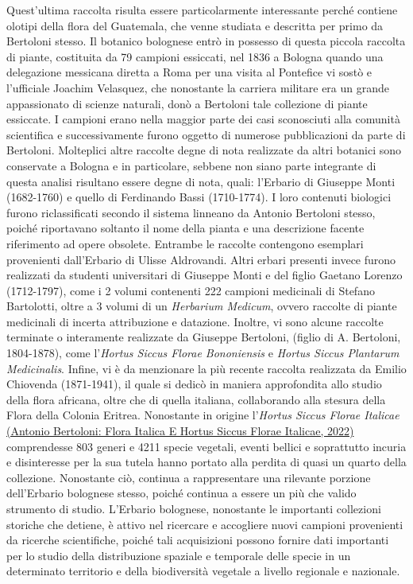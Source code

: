 \documentclass[main.tex]{subfiles}
\begin{document}
Quest’ultima raccolta risulta essere particolarmente interessante perché contiene olotipi della flora del Guatemala, che venne studiata e descritta per primo da Bertoloni stesso. Il botanico bolognese entrò in possesso di questa piccola raccolta di piante, costituita da 79 campioni essiccati, nel 1836 a Bologna quando una delegazione messicana diretta a Roma per una visita al Pontefice vi sostò e l’ufficiale Joachim Velasquez, che nonostante la carriera militare era un grande appassionato di scienze naturali, donò a Bertoloni tale collezione di piante essiccate. I campioni erano nella maggior parte dei casi sconosciuti alla comunità scientifica e successivamente furono oggetto di numerose pubblicazioni da parte di Bertoloni.
Molteplici altre raccolte degne di nota realizzate da altri botanici sono conservate a Bologna e in particolare, sebbene non siano parte integrante di questa analisi risultano essere degne di nota, quali: l’Erbario di Giuseppe Monti (1682-1760) e quello di Ferdinando Bassi (1710-1774). I loro contenuti biologici furono riclassificati secondo il sistema linneano da Antonio Bertoloni stesso, poiché riportavano soltanto il nome della pianta e una descrizione facente riferimento ad opere obsolete. Entrambe le raccolte contengono esemplari provenienti dall’Erbario di Ulisse Aldrovandi. Altri erbari presenti invece furono realizzati da studenti universitari di Giuseppe Monti e del figlio Gaetano Lorenzo (1712-1797), come i 2 volumi contenenti 222 campioni medicinali di Stefano Bartolotti, oltre a 3 volumi di un \textit{Herbarium Medicum}, ovvero raccolte di piante medicinali di incerta attribuzione e datazione. Inoltre, vi sono alcune raccolte terminate o interamente realizzate da Giuseppe Bertoloni, (figlio di A. Bertoloni, 1804-1878), come l’\textit{Hortus Siccus Florae Bononiensis} e \textit{Hortus Siccus Plantarum Medicinalis}. Infine, vi è da menzionare la più recente raccolta realizzata da Emilio Chiovenda (1871-1941), il quale si dedicò in maniera approfondita allo studio della flora africana, oltre che di quella italiana, collaborando alla stesura della Flora della Colonia Eritrea.
Nonostante in origine l’\textit{Hortus Siccus Florae Italicae} \href{https://sma.unibo.it/it/il-sistema-museale/orto-botanico-ed-erbario/collezioni/antonio-bertoloni-flora-italica-e-hortus-siccus-florae-italicae}{(Antonio Bertoloni: Flora Italica E Hortus Siccus Florae Italicae, 2022)} comprendesse 803 generi e 4211 specie vegetali, eventi bellici e soprattutto incuria e disinteresse per la sua tutela hanno portato alla perdita di quasi un quarto della collezione. Nonostante ciò, continua a rappresentare una rilevante porzione dell’Erbario bolognese stesso, poiché continua a essere un più che valido strumento di studio.
L’Erbario bolognese, nonostante le importanti collezioni storiche che detiene, è attivo nel ricercare e accogliere nuovi campioni provenienti da ricerche scientifiche, poiché tali acquisizioni possono fornire dati importanti per lo studio della distribuzione spaziale e temporale delle specie in un determinato territorio e della biodiversità vegetale a livello regionale e nazionale.
\end{document}
